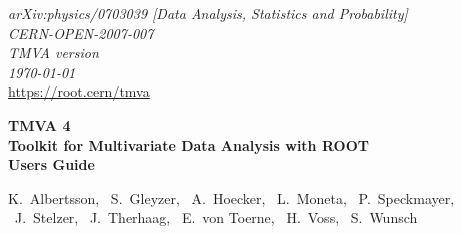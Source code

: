 \vspace{-1cm}
\begin{flushright}
{\sf\em arXiv:physics/0703039 [Data Analysis, Statistics and Probability]} \\
{\sf\em CERN-OPEN-2007-007} \\
{\sf\em TMVA version \TMVAVersion} \\
{\sf\em \today} \\
\def\UrlFont{\sf\em}
\url{https://root.cern/tmva} 
\end{flushright}
\def\UrlFont{\rm}

\def\miniPageOffset{0.2cm}
\def\miniPageWidth{13.5cm}
\HRule
\begin{flushleft}
\hspace{\miniPageOffset}\begin{minipage}{\miniPageWidth}
{\sf\Huge\bfseries\boldmath TMVA 4} \\[0.2cm]
{\sf\Large\bfseries\boldmath Toolkit for Multivariate Data Analysis with ROOT} \\[1cm]
{\sf\Huge\bfseries\boldmath Users Guide} 
\end{minipage}
\end{flushleft}
\HRule
\vspace{2.0cm}
\begin{flushright}
{\sf\Large
   K.~Albertsson,
   ~S.~Gleyzer,
   ~A.~Hoecker,
   ~L.~Moneta,
   ~P.~Speckmayer,\\
   ~J.~Stelzer,
   ~J.~Therhaag,
   ~E.~von Toerne,
   ~H.~Voss,
   ~S.~Wunsch
}

\vspace{1.2cm}

\end{flushright}


